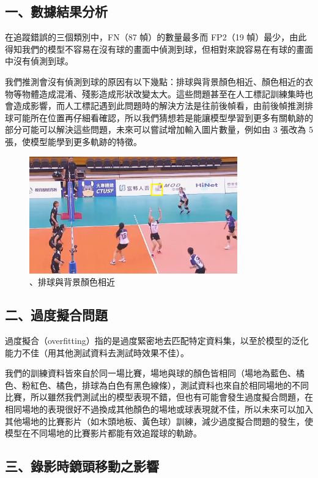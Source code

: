 \subsection{一、數據結果分析}

在追蹤錯誤的三個類別中，FN（87 幀）的數量最多而 FP2（19 幀）最少，由此得知我們的模型不容易在沒有球的畫面中偵測到球，但相對來說容易在有球的畫面中沒有偵測到球。

我們推測會沒有偵測到球的原因有以下幾點：排球與背景顏色相近、顏色相近的衣物等物體造成混淆、殘影造成形狀改變太大。這些問題甚至在人工標記訓練集時也會造成影響，而人工標記遇到此問題時的解決方法是往前後幀看，由前後幀推測排球可能所在位置再仔細看確認，所以我們猜想若是能讓模型學習到更多有關軌跡的部分可能可以解決這些問題，未來可以嘗試增加輸入圖片數量，例如由 3 張改為 5 張，使模型能學到更多軌跡的特徵。

\begin{figure}[H]
    \centering
    \includegraphics[width = 9cm]{picture/排球與背景顏色相近.jpg}
    \caption{、排球與背景顏色相近}
    \label{排球與背景顏色相近}
\end{figure}

\subsection{二、過度擬合問題}

過度擬合（overfitting）指的是過度緊密地去匹配特定資料集，以至於模型的泛化能力不佳（用其他測試資料去測試時效果不佳）。

我們的訓練資料皆來自於同一場比賽，場地與球的顏色皆相同（場地為藍色、橘色、粉紅色、橘色，排球為白色有黑色線條），測試資料也來自於相同場地的不同比賽，所以雖然我們測試出的模型表現不錯，但也有可能會發生過度擬合問題，在相同場地的表現很好不過換成其他顏色的場地或球表現就不佳，所以未來可以加入其他場地的比賽影片（如木頭地板、黃色球）訓練，減少過度擬合問題的發生，使模型在不同場地的比賽影片都能有效追蹤球的軌跡。

\subsection{三、錄影時鏡頭移動之影響}

